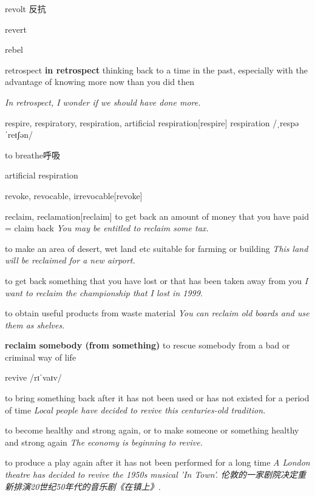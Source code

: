 \begin{DefWord}{revolt}
    反抗
\end{DefWord}

\begin{DefWord}{revert}
\end{DefWord}

\begin{DefWord}{rebel}
\end{DefWord}

\begin{DefWord}{retrospect}
    \textbf{in retrospect} thinking back to a time in the past, especially with the advantage of knowing more now than you did then

    \textit{In retrospect, I wonder if we should have done more.}
\end{DefWord}

\begin{DefWord}{respire, respiratory, respiration, artificial respiration}[respire]
    respiration /ˌrespəˈreɪʃən/ 

    to breathe呼吸

    artificial respiration
\end{DefWord}

\begin{DefWord}{revoke, revocable, irrevocable}[revoke]
\end{DefWord}

\begin{DefWord}{reclaim, reclamation}[reclaim]
    to get back an amount of money that you have paid = claim back
    \textit{You may be entitled to reclaim some tax.}

    to make an area of desert, wet land etc suitable for farming or building
    \textit{This land will be reclaimed for a new airport.}

    to get back something that you have lost or that has been taken away from you
    \textit{I want to reclaim the championship that I lost in 1999.}

    to obtain useful products from waste material
    \textit{You can reclaim old boards and use them as shelves.}

    \textbf{reclaim somebody (from something)} to rescue somebody from a bad or criminal way of life
\end{DefWord}

\begin{DefWord}{revive}
    /rɪˈvaɪv/

    to bring something back after it has not been used or has not existed for a period of time
    \textit{Local people have decided to revive this centuries-old tradition.}

    to become healthy and strong again, or to make someone or something healthy and strong again
    \textit{The economy is beginning to revive.}

    to produce a play again after it has not been performed for a long time
    \textit{A London theatre has decided to revive the 1950s musical 'In Town'. 伦敦的一家剧院决定重新排演20世纪50年代的音乐剧《在镇上》. }
\end{DefWord}

